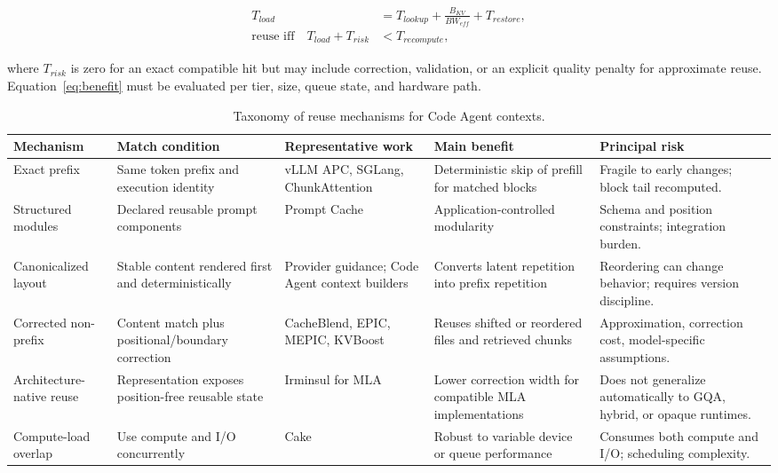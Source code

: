 \documentclass[conference,10pt]{IEEEtran}
\begin{document}
\begin{align}
T_{load} &= T_{lookup} + \frac{B_{KV}}{BW_{eff}} + T_{restore}, \\
\text{reuse iff}\quad T_{load} + T_{risk} &< T_{recompute},
\label{eq:benefit}
\end{align}

where $T_{risk}$ is zero for an exact compatible hit but may include correction, validation, or an explicit quality penalty for approximate reuse. Equation~\ref{eq:benefit} must be evaluated per tier, size, queue state, and hardware path.

\begin{table}[t]
\caption{Taxonomy of reuse mechanisms for Code Agent contexts.}
\label{tab:reuse}
\centering
\small
\begin{tabularx}{\textwidth}{p{}p{}p{}p{}Y}
\toprule
Mechanism & Match condition & Representative work & Main benefit & Principal risk \\
\midrule
Exact prefix & Same token prefix and execution identity & vLLM APC, SGLang, ChunkAttention & Deterministic skip of prefill for matched blocks & Fragile to early changes; block tail recomputed. \\
Structured modules & Declared reusable prompt components & Prompt Cache & Application-controlled modularity & Schema and position constraints; integration burden. \\
Canonicalized layout & Stable content rendered first and deterministically & Provider guidance; Code Agent context builders & Converts latent repetition into prefix repetition & Reordering can change behavior; requires version discipline. \\
Corrected non-prefix & Content match plus positional/boundary correction & CacheBlend, EPIC, MEPIC, KVBoost & Reuses shifted or reordered files and retrieved chunks & Approximation, correction cost, model-specific assumptions. \\
Architecture-native reuse & Representation exposes position-free reusable state & Irminsul for MLA & Lower correction width for compatible MLA implementations & Does not generalize automatically to GQA, hybrid, or opaque runtimes. \\
Compute-load overlap & Use compute and I/O concurrently & Cake & Robust to variable device or queue performance & Consumes both compute and I/O; scheduling complexity. \\
\bottomrule
\end{tabularx}
\end{table}
\end{document}
